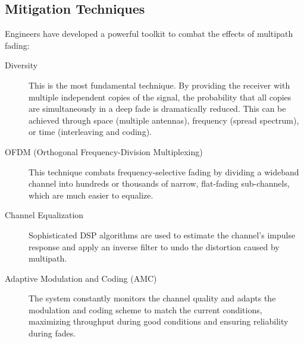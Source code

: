 \subsection{Mitigation Techniques}

Engineers have developed a powerful toolkit to combat the effects of multipath fading:
\begin{description}
    \item[Diversity] This is the most fundamental technique. By providing the receiver with multiple independent copies of the signal, the probability that all copies are simultaneously in a deep fade is dramatically reduced. This can be achieved through space (multiple antennas), frequency (spread spectrum), or time (interleaving and coding).
    \item[OFDM (Orthogonal Frequency-Division Multiplexing)] This technique combats frequency-selective fading by dividing a wideband channel into hundreds or thousands of narrow, flat-fading sub-channels, which are much easier to equalize.
    \item[Channel Equalization] Sophisticated DSP algorithms are used to estimate the channel's impulse response and apply an inverse filter to undo the distortion caused by multipath.
    \item[Adaptive Modulation and Coding (AMC)] The system constantly monitors the channel quality and adapts the modulation and coding scheme to match the current conditions, maximizing throughput during good conditions and ensuring reliability during fades.
\end{description}


